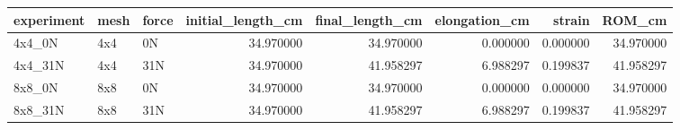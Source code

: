 \begin{tabular}{lllrrrrr}
\toprule
experiment & mesh & force & initial_length_cm & final_length_cm & elongation_cm & strain & ROM_cm \\
\midrule
4x4_0N & 4x4 & 0N & 34.970000 & 34.970000 & 0.000000 & 0.000000 & 34.970000 \\
4x4_31N & 4x4 & 31N & 34.970000 & 41.958297 & 6.988297 & 0.199837 & 41.958297 \\
8x8_0N & 8x8 & 0N & 34.970000 & 34.970000 & 0.000000 & 0.000000 & 34.970000 \\
8x8_31N & 8x8 & 31N & 34.970000 & 41.958297 & 6.988297 & 0.199837 & 41.958297 \\
\bottomrule
\end{tabular}
